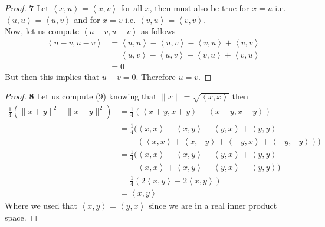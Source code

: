 \documentclass[11pt]{article}
\newcommand{\inprd}[1]{\left\langle{#1}\right\rangle}
\theoremstyle{definition}
\begin{document}
\cleardoublepage
\begin{proof}{\textbf{7}}
Let $\inprd{x,u} = \inprd{x,v}$ for all $x$, then
must also be true for $x = u$ i.e. $\inprd{u, u} = \inprd{u,v}$
and for $x = v$ i.e. $\inprd{v, u} = \inprd{v,v}$.\\
Now, let us compute $\inprd{u- v, u - v}$ as follows
\begin{align*}
    \inprd{u- v, u - v}
    &= \inprd{u, u} - \inprd{u,v} - \inprd{v, u} + \inprd{v, v}\\
    &= \inprd{u, v} - \inprd{u,v} - \inprd{v, u} + \inprd{v, u}\\
    &= 0
\end{align*}
But then this implies that $u - v = 0$. Therefore $u = v$.
\end{proof}
\begin{proof}{\textbf{8}}
Let us compute (9) knowing that $\|x\| = \sqrt{\inprd{x,x}}$ then 
\begin{align*}
    \frac{1}{4}(\|x + y\|^2 - \|x -y\|^2)
    &= \frac{1}{4}(\inprd{x + y, x + y} - \inprd{x - y, x - y})\\
    &= \frac{1}{4}(\inprd{x,x} + \inprd{x,y} + \inprd{y,x} + \inprd{y,y} -\\
    &\quad- (\inprd{x,x} + \inprd{x,-y} + \inprd{-y,x} + \inprd{-y,-y}))\\
    &= \frac{1}{4}(\inprd{x,x} + \inprd{x,y} + \inprd{y,x} + \inprd{y,y} -\\
    &\quad- \inprd{x,x} + \inprd{x,y} + \inprd{y,x} - \inprd{y,y})\\
    &= \frac{1}{4}(2\inprd{x,y} + 2\inprd{x,y})\\
    &= \inprd{x,y}
\end{align*}
Where we used that $\inprd{x,y} = \inprd{y,x}$ since we are in a real inner
product space.
\end{proof}
\end{document}
